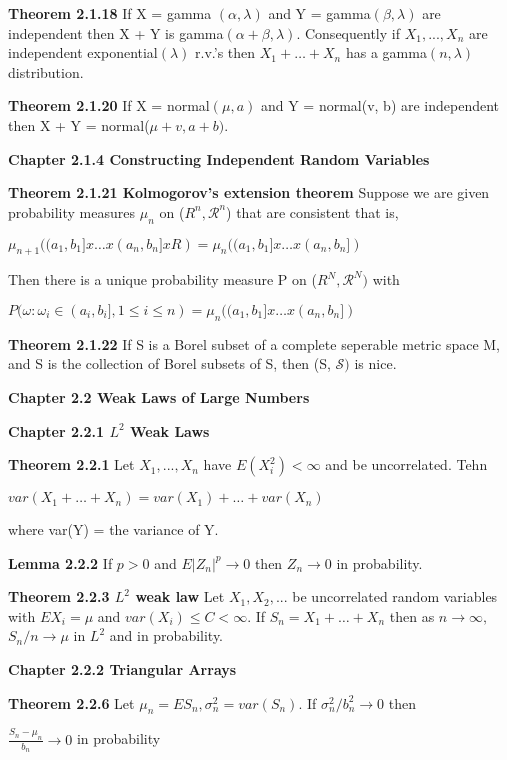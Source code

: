 \documentclass{article}
\begin{document}
\textbf {Theorem 2.1.18} If X = gamma $(\alpha, \lambda)$ and Y = gamma$(\beta, \lambda)$ are independent then X + Y is gamma$(\alpha + \beta, \lambda)$. Consequently if $X_1,...,X_n$ are independent exponential$(\lambda)$ r.v.'s then $X_1 + \dots + X_n$ has a gamma$(n, \lambda)$ distribution.

\textbf {Theorem 2.1.20} If X = normal$(\mu, a)$ and Y = normal(v, b) are independent then X + Y = normal($\mu + v, a + b)$.

\textbf {Chapter 2.1.4 Constructing Independent Random Variables}

\textbf {Theorem 2.1.21 Kolmogorov's extension theorem} Suppose we are given probability measures $\mu_n$ on ($R^n, \mathcal{R}^n$) that are consistent that is,
\begin{center}
$\mu_{n+1} ((a_1 , b_1] x \dots x (a_n , b_n] x R) = \mu_n ((a_1, b_1] x \dots x (a_n, b_n])$
\end{center}
Then there is a unique probability measure P on ($R^N, \mathcal{R}^N)$ with
\begin{center}
$P(\omega : \omega_i \in (a_i, b_i], 1 \leq i \leq n) = \mu_n ((a_1, b_1] x \dots x (a_n, b_n])$
\end{center}

\textbf {Theorem 2.1.22} If S is a Borel subset of a complete seperable metric space M, and S is the collection of Borel subsets of S, then (S, $\mathcal{S})$ is nice.

\textbf {Chapter 2.2 Weak Laws of Large Numbers}

\textbf {Chapter 2.2.1 $L^2$ Weak Laws}

\textbf {Theorem 2.2.1} Let $X_1 ,..., X_n$ have $E(X_i^2) < \infty$ and be uncorrelated. Tehn
\begin{center}
$var(X_1 + \dots + X_n) = var(X_1) + \dots + var(X_n)$
\end{center}
where var(Y) = the variance of Y.

\textbf {Lemma 2.2.2} If $p > 0$ and $E|Z_n|^p \rightarrow 0$ then $Z_n \rightarrow 0$ in probability.

\textbf {Theorem 2.2.3 $L^2$ weak law} Let $X_1, X_2 ,...$ be uncorrelated random variables with $EX_i = \mu$ and $var(X_i) \leq C < \infty$. If $S_n = X_1 + \dots + X_n$ then as $n \rightarrow \infty,$ ${S_n}/n \rightarrow \mu$ in $L^2$ and in probability.

\textbf {Chapter 2.2.2 Triangular Arrays} 

\textbf {Theorem 2.2.6} Let $\mu_n = ES_n, \sigma_n^2 = var(S_n)$. If $\sigma_n^2 /b_n^2 \rightarrow 0$ then
\begin{center}
$\frac{S_n - \mu_n}{b_n} \rightarrow 0$ in probability
\end{center}
\end{document}
